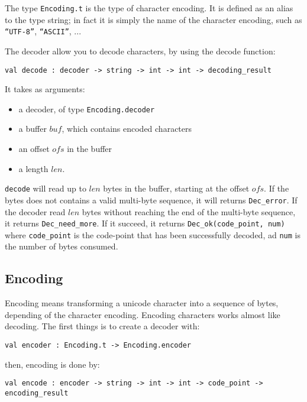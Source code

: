 \documentclass{article}
\begin{document}
The type \texttt{Encoding.t} is the type of character encoding. It is
defined as an alias to the type string; in fact it is simply the name
of the character encoding, such as \texttt{``UTF-8''},
\texttt{``ASCII''}, ...

The decoder allow you to decode characters, by using the decode
function:

\lstset{language=[Objective]Caml}\begin{lstlisting}
val decode : decoder -> string -> int -> int -> decoding_result
\end{lstlisting}

It takes as arguments:
\begin{itemize}
\item a decoder, of type \texttt{Encoding.decoder}
\item a buffer $buf$, which contains encoded characters
\item an offset $ofs$ in the buffer
\item a length $len$.
\end{itemize}

\texttt{decode} will read up to $len$ bytes in the buffer, starting at
the offset $ofs$. If the bytes does not contains a valid multi-byte
sequence, it will returns \texttt{Dec\_error}. If the decoder read
$len$ bytes without reaching the end of the multi-byte sequence, it
returns \texttt{Dec\_need\_more}. If it succeed, it returns
\texttt{Dec\_ok(code\_point, num)} where \texttt{code\_point} is the
code-point that has been successfully decoded, ad \texttt{num} is the
number of bytes consumed.

\subsection{Encoding}

Encoding means transforming a unicode character into a sequence of
bytes, depending of the character encoding. Encoding characters works
almost like decoding. The first things is to create a decoder with:

\lstset{language=[Objective]Caml}\begin{lstlisting}
val encoder : Encoding.t -> Encoding.encoder
\end{lstlisting}

then, encoding is done by:

\lstset{language=[Objective]Caml}\begin{lstlisting}
val encode : encoder -> string -> int -> int -> code_point -> encoding_result
\end{lstlisting}
\end{document}
